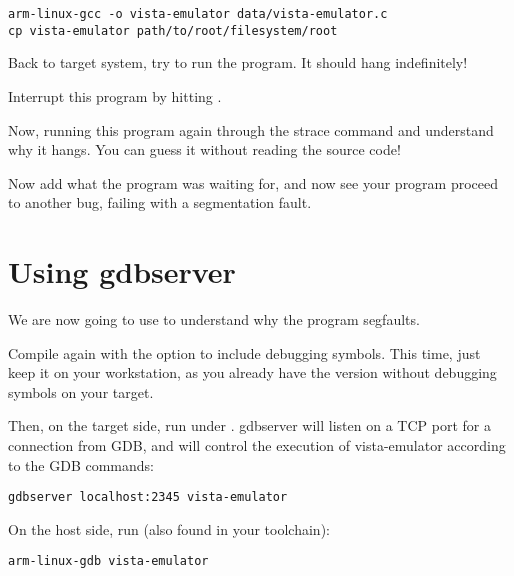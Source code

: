 \begin{verbatim}
arm-linux-gcc -o vista-emulator data/vista-emulator.c
cp vista-emulator path/to/root/filesystem/root
\end{verbatim}

Back to target system, try to run the 
program. It should hang indefinitely!

Interrupt this program by hitting \code{[Ctrl] [C]}.

Now, running this program again through the strace command and
understand why it hangs. You can guess it without reading the source
code!

Now add what the program was waiting for, and now see your program
proceed to another bug, failing with a segmentation fault.




\section{Using gdbserver}

We are now going to use  to understand why the program
segfaults.

Compile  again with the  option to
include debugging symbols. This time, just keep it on your workstation,
as you already have the version without debugging symbols on your target.

Then, on the target side, run  under
. gdbserver will listen on a TCP port for a connection
from GDB, and will control the execution of vista-emulator according
to the GDB commands:

\begin{verbatim}
gdbserver localhost:2345 vista-emulator
\end{verbatim}

On the host side, run  (also found in your toolchain):
\begin{verbatim}
arm-linux-gdb vista-emulator
\end{verbatim}

